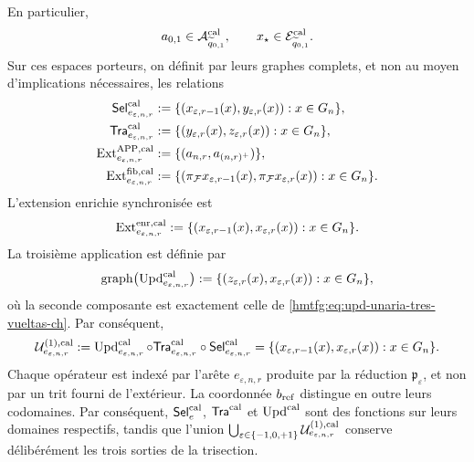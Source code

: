 En particulier,
\[
 a_{0,1}\in\mathcal A^{\rm cal}_{\widetilde q_{0,1}},
 \qquad
 x_\star\in\mathcal E^{\rm cal}_{\widetilde q_{0,1}}.
\]
Sur ces espaces porteurs, on définit par leurs graphes complets, et non au moyen d'implications nécessaires, les relations
\begin{align}
 \mathsf{Sel}^{\rm cal}_{e_{\varepsilon,n,r}}
   &:=\{(x_{\varepsilon,r-1}(x),y_{\varepsilon,r}(x)):
          x\in G_n\},\\
 \mathsf{Tra}^{\rm cal}_{e_{\varepsilon,n,r}}
   &:=\{(y_{\varepsilon,r}(x),z_{\varepsilon,r}(x)):
          x\in G_n\},\\
 \operatorname{Ext}^{\mathrm{APP},\rm cal}_{e_{\varepsilon,n,r}}
   &:=\{(a_{n,r},a_{(n,r)^+})\},
 \label{hmtfg:eq:ext-app-calibrada-ch}\\
 \operatorname{Ext}^{\rm fib,cal}_{e_{\varepsilon,n,r}}
   &:=\{(\pi_{\mathcal F}x_{\varepsilon,r-1}(x),
          \pi_{\mathcal F}x_{\varepsilon,r}(x)):x\in G_n\}.
 \label{hmtfg:eq:ext-fibra-calibrada-ch}
\end{align}
L'extension enrichie synchronisée est
\begin{equation}
 \operatorname{Ext}^{\rm enr,cal}_{e_{\varepsilon,n,r}}
 :=\{(x_{\varepsilon,r-1}(x),x_{\varepsilon,r}(x)):
       x\in G_n\}.
 \label{hmtfg:eq:ext-enriquecida-calibrada-ch}
\end{equation}
La troisième application est définie par
\begin{equation}
 \operatorname{graph}
 \bigl(\operatorname{Upd}^{\rm cal}_{e_{\varepsilon,n,r}}\bigr)
 :=\{(z_{\varepsilon,r}(x),x_{\varepsilon,r}(x)):
       x\in G_n\},
 \label{hmtfg:eq:grafo-upd-calibrado-ch}
\end{equation}
où la seconde composante est exactement celle de
\eqref{hmtfg:eq:upd-unaria-tres-vueltas-ch}. Par conséquent,
\begin{equation}
 \mathcal U^{(1),\rm cal}_{e_{\varepsilon,n,r}}
 :=\operatorname{Upd}^{\rm cal}_{e_{\varepsilon,n,r}}\circ
   \mathsf{Tra}^{\rm cal}_{e_{\varepsilon,n,r}}\circ
   \mathsf{Sel}^{\rm cal}_{e_{\varepsilon,n,r}}
 =\{(x_{\varepsilon,r-1}(x),x_{\varepsilon,r}(x)):
      x\in G_n\}.
 \label{hmtfg:eq:transicion-cal-en-tpk-ch}
\end{equation}
Chaque opérateur est indexé par l’arête
\(e_{\varepsilon,n,r}\) produite par la réduction
\(\mathfrak p_\varepsilon\), et non par un trit fourni de l’extérieur. La
coordonnée \(b_{\rm ref}\) distingue en outre leurs codomaines. Par conséquent,
\(\mathsf{Sel}^{\rm cal}_{e}\),
\(\mathsf{Tra}^{\rm cal}\) et \(\operatorname{Upd}^{\rm cal}\) sont des fonctions
sur leurs domaines respectifs, tandis que
l’union
\(\bigcup_{\varepsilon\in\{-1,0,+1\}}
\mathcal U^{(1),\rm cal}_{e_{\varepsilon,n,r}}\) conserve délibérément
les trois sorties de la trisection.

